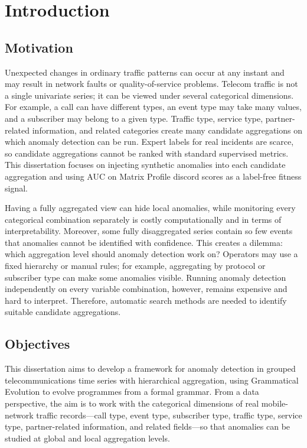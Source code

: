 \begingroup
\let\clearpage\relax
\let\cleardoublepage\relax
\chapter{Introduction}
\endgroup

\section{Motivation}

Unexpected changes in ordinary traffic patterns can occur at any instant and may result in network faults or quality-of-service problems.
Telecom traffic is not a single univariate series; it can be viewed under several categorical dimensions.
For example, a call can have different types, an event type may take many values, and a subscriber may belong to a given type.
Traffic type, service type, partner-related information, and related categories create many candidate aggregations on which anomaly detection can be run.
Expert labels for real incidents are scarce, so candidate aggregations cannot be ranked with standard supervised metrics.
This dissertation focuses on injecting synthetic anomalies into each candidate aggregation and using \ac{AUC} on Matrix Profile discord scores as a label-free fitness signal.

Having a fully aggregated view can hide local anomalies, while monitoring every categorical combination separately is costly computationally and in terms of interpretability.
Moreover, some fully disaggregated series contain so few events that anomalies cannot be identified with confidence.
This creates a dilemma: which aggregation level should anomaly detection work on?
Operators may use a fixed hierarchy or manual rules; for example, aggregating by protocol or subscriber type can make some anomalies visible.
Running anomaly detection independently on every variable combination, however, remains expensive and hard to interpret.
Therefore, automatic search methods are needed to identify suitable candidate aggregations.

\section{Objectives}

This dissertation aims to develop a framework for anomaly detection in grouped telecommunications time series with hierarchical aggregation, using Grammatical Evolution to evolve programmes from a formal grammar.
From a data perspective, the aim is to work with the categorical dimensions of real mobile-network traffic records---call type, event type, subscriber type, traffic type, service type, partner-related information, and related fields---so that anomalies can be studied at global and local aggregation levels.

